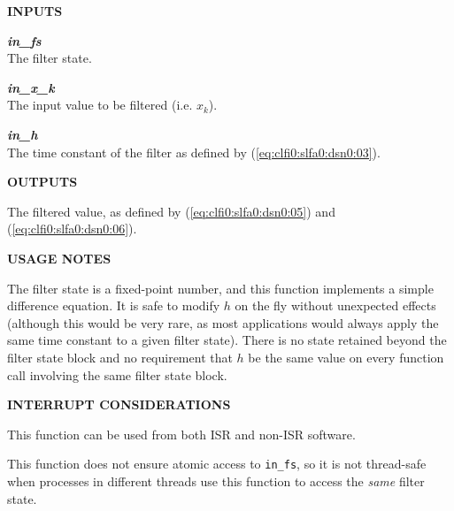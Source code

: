 \noindent\textbf{INPUTS}
\begin{list}{}{\setlength{\leftmargin}{0.5in}\setlength{\itemindent}{-0.25in}\setlength{\topsep}{0.0in}\setlength{\partopsep}{0.0in}}
\item \emph{\textbf{in\_fs}}\\
      The filter state.
\item \emph{\textbf{in\_x\_k}}\\
      The input value to be filtered (i.e. $x_k$).
\item \emph{\textbf{in\_h}}\\
      The time constant of the filter as defined by (\ref{eq:clfi0:slfa0:dsn0:03}).
\end{list}
\vspace{2.8ex}

\noindent\textbf{OUTPUTS}
\begin{list}{}{\setlength{\leftmargin}{0.25in}\setlength{\topsep}{0.0in}}
\item The filtered value, as defined by 
      (\ref{eq:clfi0:slfa0:dsn0:05}) and (\ref{eq:clfi0:slfa0:dsn0:06}).
\end{list}
\vspace{2.8ex}

\noindent\textbf{USAGE NOTES}
\begin{list}{}{\setlength{\leftmargin}{0.25in}\setlength{\topsep}{0.0in}}
\item The filter state is a fixed-point number, and this function
      implements a simple difference equation.  It is safe to modify
      $h$ on the fly without unexpected effects (although this would be very 
      rare, as most applications would always apply the same time constant to
      a given filter state).  There is no state retained beyond the filter state block
      and no requirement
      that $h$ be the same value on every function call involving the same filter
      state block.
\end{list}
\vspace{2.8ex}

\noindent\textbf{INTERRUPT CONSIDERATIONS}
\begin{list}{}{\setlength{\leftmargin}{0.25in}\setlength{\topsep}{0.0in}}
\item This function can be used from both ISR and non-ISR software.
\item This function does not ensure atomic access to \texttt{in\_fs}, so it is
      not thread-safe when processes in different threads use this function
      to access the \emph{same} filter state.
\end{list}
\vspace{2.8ex}


